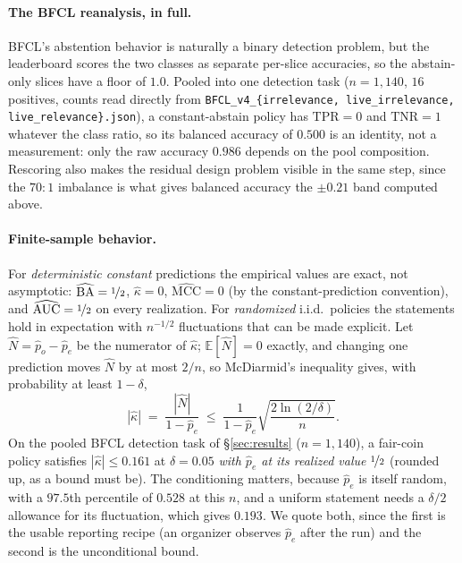 \documentclass{article}
\theoremstyle{plain}
\theoremstyle{definition}
\begin{document}
\paragraph{The BFCL reanalysis, in full.}
BFCL's abstention behavior is naturally a binary detection problem, but the leaderboard scores the two classes as separate per-slice accuracies, so the abstain-only slices have a floor of $1.0$. Pooled into one detection task ($n = 1{,}140$, $16$ positives, counts read directly from \texttt{BFCL\_v4\_\{irrelevance, live\_irrelevance, live\_relevance\}.json}), a constant-abstain policy has $\mathrm{TPR} = 0$ and $\mathrm{TNR} = 1$ whatever the class ratio, so its balanced accuracy of $0.500$ is an identity, not a measurement: only the raw accuracy $0.986$ depends on the pool composition. Rescoring also makes the residual design problem visible in the same step, since the $70{:}1$ imbalance is what gives balanced accuracy the $\pm 0.21$ band computed above.

\paragraph{Finite-sample behavior.}
For \emph{deterministic constant} predictions the empirical values are exact, not asymptotic: $\widehat{\mathrm{BA}} = \nicefrac{1}{2}$, $\hat{\kappa} = 0$, $\widehat{\mathrm{MCC}} = 0$ (by the constant-prediction convention), and $\widehat{\mathrm{AUC}} = \nicefrac{1}{2}$ on every realization. For \emph{randomized} i.i.d.\ policies the statements hold in expectation with $n^{-1/2}$ fluctuations that can be made explicit. Let $\hat{N} = \hat{p}_o - \hat{p}_e$ be the numerator of $\hat{\kappa}$; $\mathbb{E}[\hat{N}] = 0$ exactly, and changing one prediction moves $\hat{N}$ by at most $2/n$, so McDiarmid's inequality gives, with probability at least $1-\delta$,
\begin{equation}
  |\hat{\kappa}| \;=\; \frac{|\hat{N}|}{1 - \hat{p}_e} \;\le\; \frac{1}{1 - \hat{p}_e}\sqrt{\frac{2\ln(2/\delta)}{n}}.
\end{equation}
On the pooled BFCL detection task of \S\ref{sec:results} ($n = 1{,}140$), a fair-coin policy satisfies $|\hat{\kappa}| \le 0.161$ at $\delta = 0.05$ \emph{with $\hat{p}_e$ at its realized value} $\nicefrac{1}{2}$ (rounded up, as a bound must be). The conditioning matters, because $\hat{p}_e$ is itself random, with a $97.5$th percentile of $0.528$ at this $n$, and a uniform statement needs a $\delta/2$ allowance for its fluctuation, which gives $0.193$. We quote both, since the first is the usable reporting recipe (an organizer observes $\hat{p}_e$ after the run) and the second is the unconditional bound.
\end{document}
